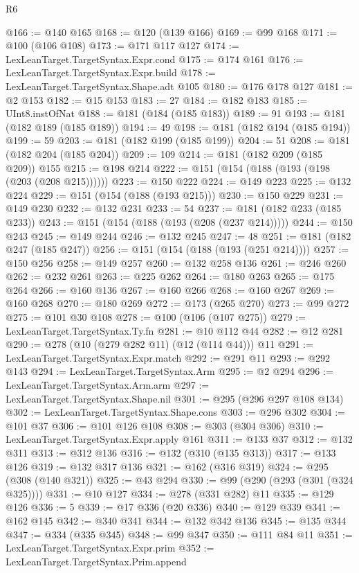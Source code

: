 \begin{lexlean}{R6}
\begin{coremodule}
{{{{{{{{{{{{{{{{{{{{{{{{{{{{{{{{{{{{{{{{{{{{{{{{{{@166 := @140 @165
@168 := @120 (@139 @166)
@169 := @99 @168
@171 := @100 (@106 @108)
@173 := @171 @117 @127
@174 := LexLeanTarget.TargetSyntax.Expr.cond
@175 := @174 @161
@176 := LexLeanTarget.TargetSyntax.Expr.build
@178 := LexLeanTarget.TargetSyntax.Shape.adt @105
@180 := @176 @178 @127
@181 := @2 @153
@182 := @15 @153
@183 := 27
@184 := @182 @183
@185 := UInt8.instOfNat
@188 := @181 (@184 (@185 @183))
@189 := 91
@193 := @181 (@182 @189 (@185 @189))
@194 := 49
@198 := @181 (@182 @194 (@185 @194))
@199 := 59
@203 := @181 (@182 @199 (@185 @199))
@204 := 51
@208 := @181 (@182 @204 (@185 @204))
@209 := 109
@214 := @181 (@182 @209 (@185 @209)) @155
@215 := @198 @214
@222 := @151 (@154 (@188 (@193 (@198 (@203 (@208 @215))))))
@223 := @150 @222
@224 := @149 @223
@225 := @132 @224
@229 := @151 (@154 (@188 (@193 @215)))
@230 := @150 @229
@231 := @149 @230
@232 := @132 @231
@233 := 54
@237 := @181 (@182 @233 (@185 @233))
@243 := @151 (@154 (@188 (@193 (@208 (@237 @214)))))
@244 := @150 @243
@245 := @149 @244
@246 := @132 @245
@247 := 48
@251 := @181 (@182 @247 (@185 @247))
@256 := @151 (@154 (@188 (@193 (@251 @214))))
@257 := @150 @256
@258 := @149 @257
@260 := @132 @258 @136
@261 := @246 @260
@262 := @232 @261
@263 := @225 @262
@264 := @180 @263
@265 := @175 @264
@266 := @160 @136
@267 := @160 @266
@268 := @160 @267
@269 := @160 @268
@270 := @180 @269
@272 := @173 (@265 @270)
@273 := @99 @272
@275 := @101 @30 @108
@278 := @100 (@106 (@107 @275))
@279 := LexLeanTarget.TargetSyntax.Ty.fn
@281 := @10 @112 @44
@282 := @12 @281
@290 := @278 (@10 (@279 @282 @11) (@12 (@114 @44))) @11
@291 := LexLeanTarget.TargetSyntax.Expr.match
@292 := @291 @11
@293 := @292 @143
@294 := LexLeanTarget.TargetSyntax.Arm
@295 := @2 @294
@296 := LexLeanTarget.TargetSyntax.Arm.arm
@297 := LexLeanTarget.TargetSyntax.Shape.nil
@301 := @295 (@296 @297 @108 @134)
@302 := LexLeanTarget.TargetSyntax.Shape.cons
@303 := @296 @302
@304 := @101 @37
@306 := @101 @126 @108
@308 := @303 (@304 @306)
@310 := LexLeanTarget.TargetSyntax.Expr.apply @161
@311 := @133 @37
@312 := @132 @311
@313 := @312 @136
@316 := @132 (@310 (@135 @313))
@317 := @133 @126
@319 := @132 @317 @136
@321 := @162 (@316 @319)
@324 := @295 (@308 (@140 @321))
@325 := @43 @294
@330 := @99 (@290 (@293 (@301 (@324 @325))))
@331 := @10 @127
@334 := @278 (@331 @282) @11
@335 := @129 @126
@336 := 5
@339 := @17 @336 (@20 @336)
@340 := @129 @339
@341 := @162 @145
@342 := @340 @341
@344 := @132 @342 @136
@345 := @135 @344
@347 := @334 (@335 @345)
@348 := @99 @347
@350 := @111 @84 @11
@351 := LexLeanTarget.TargetSyntax.Expr.prim
@352 := LexLeanTarget.TargetSyntax.Prim.append
}}}}}}}}}}}}}}}}}}}}}}}}}}}}}}}}}}}}}}}}}}}}}}}}}}
\end{coremodule}
\end{lexlean}
